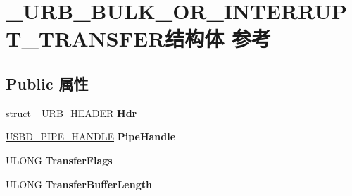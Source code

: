 \hypertarget{struct___u_r_b___b_u_l_k___o_r___i_n_t_e_r_r_u_p_t___t_r_a_n_s_f_e_r}{}\section{\+\_\+\+U\+R\+B\+\_\+\+B\+U\+L\+K\+\_\+\+O\+R\+\_\+\+I\+N\+T\+E\+R\+R\+U\+P\+T\+\_\+\+T\+R\+A\+N\+S\+F\+E\+R结构体 参考}
\label{struct___u_r_b___b_u_l_k___o_r___i_n_t_e_r_r_u_p_t___t_r_a_n_s_f_e_r}
\subsection*{Public 属性}
\begin{DoxyCompactItemize}
\item 
\mbox{\label{struct___u_r_b___b_u_l_k___o_r___i_n_t_e_r_r_u_p_t___t_r_a_n_s_f_e_r_a14ea2803d1cc645e38827acfe88bc46f}} 
\hyperlink{interfacestruct}{struct} \hyperlink{struct___u_r_b___h_e_a_d_e_r}{\+\_\+\+U\+R\+B\+\_\+\+H\+E\+A\+D\+ER} {\bfseries Hdr}
\item 
\mbox{\label{struct___u_r_b___b_u_l_k___o_r___i_n_t_e_r_r_u_p_t___t_r_a_n_s_f_e_r_a0dfb8c30930840aba51003f1420a39a5}} 
\hyperlink{interfacevoid}{U\+S\+B\+D\+\_\+\+P\+I\+P\+E\+\_\+\+H\+A\+N\+D\+LE} {\bfseries Pipe\+Handle}
\item 
\mbox{\label{struct___u_r_b___b_u_l_k___o_r___i_n_t_e_r_r_u_p_t___t_r_a_n_s_f_e_r_a07deeeca0e8ad68981dbbeab0b64144c}} 
U\+L\+O\+NG {\bfseries Transfer\+Flags}
\item 
\mbox{\label{struct___u_r_b___b_u_l_k___o_r___i_n_t_e_r_r_u_p_t___t_r_a_n_s_f_e_r_a31c6728b53bad39dcb592d6ceaf62bd1}} 
U\+L\+O\+NG {\bfseries Transfer\+Buffer\+Length}
\item 
\mbox{\label{struct___u_r_b___b_u_l_k___o_r___i_n_t_e_r_r_u_p_t___t_r_a_n_s_f_e_r_a3bc8c87b53a65ea258a78ff802ed325e}} 

\end{DoxyCompactItemize}
